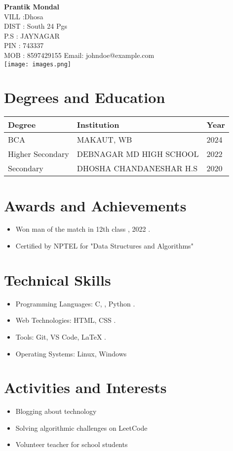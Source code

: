 \documentclass[12pt]{article}
\begin{document}
\begin{center}
    \Huge \textbf{Prantik Mondal} \\
    \normalsize
    VILL :Dhosa \\
    DIST : South 24 Pgs   \\
    P.S : JAYNAGAR \\
    PIN : 743337 \\
    MOB : 8597429155
     \quad Email: johndoe@example.com \\
    \vspace{0.5cm}
    \texttt{[image: images.png]} %
\end{center}

\section*{Degrees and Education}
\begin{tabular}{|p{4cm}|p{4cm}|p{4cm}|}
    \hline
    Degree & Institution & Year \\
    \hline
    BCA & MAKAUT, WB & 2024 \\
    Higher Secondary & DEBNAGAR MD HIGH SCHOOL  & 2022 \\
    Secondary & DHOSHA CHANDANESHAR H.S & 2020 \\
    \hline
\end{tabular}

\section*{Awards and Achievements}
\begin{itemize}[noitemsep]
    \item Won man of the match in 12th class , 2022 . \\
    \item Certified by NPTEL for "Data Structures and Algorithms"
    
\end{itemize}

\section*{Technical Skills}
\begin{itemize}[noitemsep]
    \item Programming Languages: C, , Python . \\
    \item Web Technologies: HTML, CSS .
    \item Tools: Git, VS Code, LaTeX .
    \item Operating Systems: Linux, Windows
\end{itemize}

\section*{Activities and Interests}
\begin{itemize}[noitemsep]
    \item Blogging about technology
    \item Solving algorithmic challenges on LeetCode
    \item Volunteer teacher for school students
\end{itemize}
\end{document}

